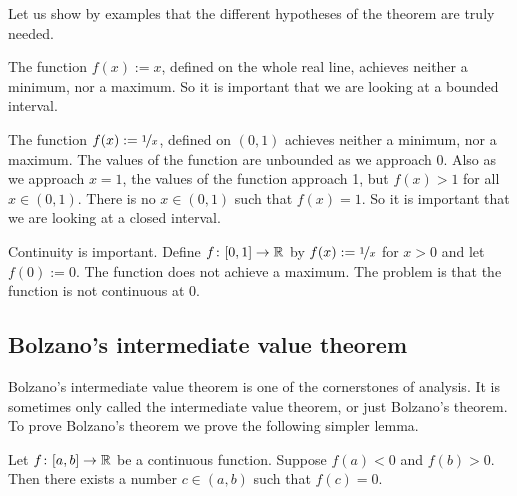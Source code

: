 Let us show by examples that the different hypotheses of the theorem are
truly needed.

\begin{example}
The function $f(x) := x$, defined on the whole real line,
achieves neither a minimum, nor a maximum.  So it is important that
we are looking at a bounded interval.
\end{example}

\begin{example}
The function $f(x) := \nicefrac{1}{x}$, defined on $(0,1)$ 
achieves neither a minimum, nor a maximum.  The values of the function are
unbounded as we approach 0.  Also as we approach $x=1$, the values of the
function approach 1, but $f(x) > 1$ for all $x \in (0,1)$.  There is
no $x \in (0,1)$ such that $f(x) = 1$.  So it is important that
we are looking at a closed interval.
\end{example}

\begin{example}
Continuity is important.
Define $f \colon [0,1] \to {\mathbb{R}}$ by 
$f(x) := \nicefrac{1}{x}$ for $x > 0$ and let $f(0) := 0$.
The function does not achieve a maximum.  The problem is that
the function is not continuous at 0.
\end{example}

\subsection{Bolzano's intermediate value theorem}

Bolzano's intermediate value theorem is one of the cornerstones of analysis.
It is sometimes only called the intermediate value theorem, or just
Bolzano's theorem.  To prove Bolzano's theorem we prove the
following simpler lemma.

\begin{lemma} \label{IVT:lemma}
Let $f \colon [a,b] \to {\mathbb{R}}$ be a continuous function.
Suppose $f(a) < 0$ and $f(b) > 0$. 
Then there exists a number $c \in (a,b)$
such that $f(c) = 0$.
\end{lemma}

